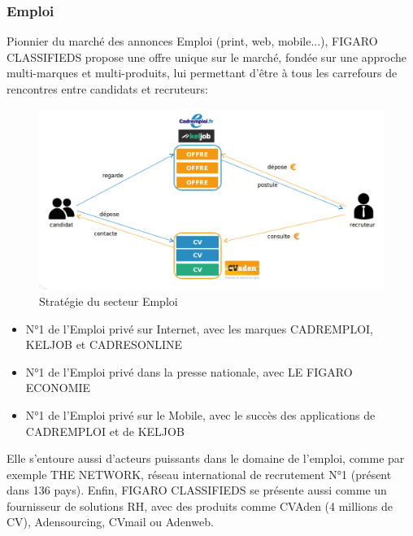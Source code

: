 \subsubsection{Emploi}
Pionnier du marché des annonces Emploi (print, web, mobile...), FIGARO CLASSIFIEDS propose une offre unique sur le marché, fondée sur une approche multi-marques et multi-produits, lui permettant d'être à tous les carrefours de rencontres entre candidats et recruteurs:
\begin{figure}[b]
  \begin{center}
    \hspace*{-1in}
    \includegraphics[width=1.25\textwidth]{Pictures/EmploiFCMS.png}
    \caption{Stratégie du secteur Emploi}
  \end{center}
\end{figure}
\begin{itemize}
  \item N°1 de l'Emploi privé sur Internet, avec les marques CADREMPLOI, KELJOB et CADRESONLINE
  \item N°1 de l'Emploi privé dans la presse nationale, avec LE FIGARO ECONOMIE
  \item N°1 de l'Emploi privé sur le Mobile, avec le succès des applications de CADREMPLOI et de KELJOB
\end{itemize}
Elle s'entoure aussi d'acteurs puissants dans le domaine de l'emploi, comme par exemple THE NETWORK, réseau international de recrutement N°1 (présent dans 136 pays).
Enfin, FIGARO CLASSIFIEDS se présente aussi comme un fournisseur de solutions RH, avec des produits comme CVAden (4 millions de CV), Adensourcing, CVmail ou Adenweb.
